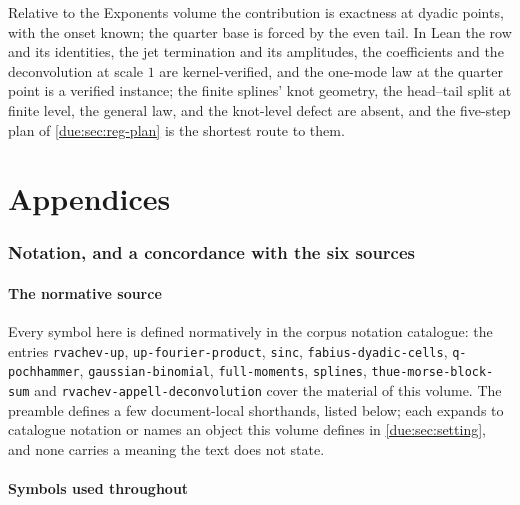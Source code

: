 \documentclass[11pt,oneside]{article}
\theoremstyle{plain}
\theoremstyle{definition}
\theoremstyle{remark}
\begin{document}
\begin{summarybox}[title={Section summary}]
Relative to the Exponents volume the contribution is exactness at dyadic
points, with the onset known; the quarter base is forced by the even tail.
In Lean the row and its identities, the jet termination and its amplitudes,
the coefficients and the deconvolution at scale $1$ are kernel-verified,
and the one-mode law at the quarter point is a verified instance; the
finite splines' knot geometry, the head--tail split at finite level, the
general law, and the knot-level defect are absent, and the five-step plan
of \cref{due:sec:reg-plan} is the shortest route to them.
\end{summarybox}

\clearpage
\appendix
\part*{Appendices}

\section{Notation, and a concordance with the six sources}
\label{due:sec:notation}

\subsection{The normative source}

\begin{sloppypar}
Every symbol here is defined normatively in the corpus notation catalogue:
the entries \texttt{rvachev-up}, \texttt{up-fourier-product}, \texttt{sinc},
\texttt{fabius-dyadic-cells}, \texttt{q-pochhammer},
\texttt{gaussian-binomial}, \texttt{full-moments}, \texttt{splines},
\texttt{thue-morse-block-sum} and \texttt{rvachev-\allowbreak appell-\allowbreak deconvolution}
cover the material of this volume.  The preamble defines a few document-local
shorthands, listed below; each expands to catalogue notation or names an
object this volume defines in \cref{due:sec:setting}, and none carries a
meaning the text does not state.
\end{sloppypar}

\subsection{Symbols used throughout}
\end{document}
